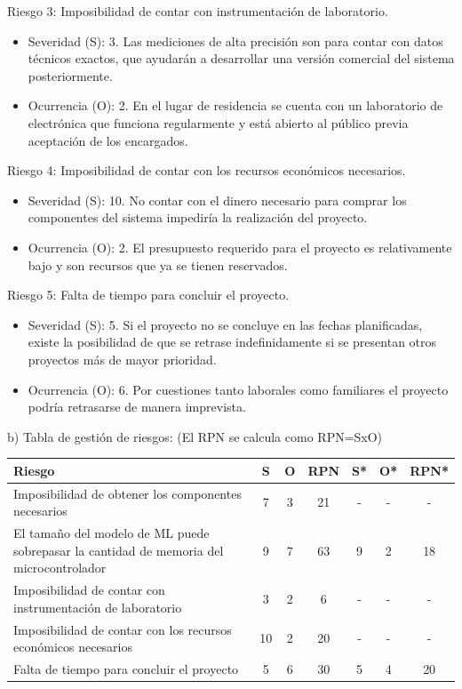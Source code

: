 \documentclass[
11pt, %
]{plan}
\begin{document}
Riesgo 3: Imposibilidad de contar con instrumentación de laboratorio.
\begin{itemize}
	\item Severidad (S): 3. Las mediciones de alta precisión son para contar con datos técnicos exactos, que ayudarán a desarrollar una versión comercial del sistema posteriormente.
	\item Ocurrencia (O): 2. En el lugar de residencia se cuenta con un laboratorio de electrónica que funciona regularmente y está abierto al público previa aceptación de los encargados.
\end{itemize}

Riesgo 4: Imposibilidad de contar con los recursos económicos necesarios.
\begin{itemize}
	\item Severidad (S): 10. No contar con el dinero necesario para comprar los componentes del sistema impediría la realización del proyecto.
	\item Ocurrencia (O): 2. El presupuesto requerido para el proyecto es relativamente bajo y son recursos que ya se tienen reservados.
\end{itemize}

Riesgo 5: Falta de tiempo para concluir el proyecto.
\begin{itemize}
	\item Severidad (S): 5. Si el proyecto no se concluye en las fechas planificadas, existe la posibilidad de que se retrase indefinidamente si se presentan otros proyectos más de mayor prioridad.
	\item Ocurrencia (O): 6. Por cuestiones tanto laborales como familiares el proyecto podría retrasarse de manera imprevista.
\end{itemize}

b) Tabla de gestión de riesgos:      (El RPN se calcula como RPN=SxO)

\begin{table}[htpb]
\centering
\begin{tabularx}{\linewidth}{@{}|X|c|c|c|c|c|c|@{}}
\hline
\rowcolor[HTML]{C0C0C0}
Riesgo & S & O & RPN & S* & O* & RPN* \\ \hline
Imposibilidad de obtener los componentes necesarios & 7 & 3 & 21 & - & - & -\\ \hline
El tamaño del modelo de ML puede sobrepasar la cantidad de memoria del microcontrolador & 9 & 7 & 63 & 9 & 2 & 18\\ \hline
Imposibilidad de contar con instrumentación de laboratorio & 3 & 2 & 6 & - & - & -\\ \hline
Imposibilidad de contar con los recursos económicos necesarios & 10 & 2 & 20 & - & - & -\\ \hline
Falta de tiempo para concluir el proyecto & 5 & 6 & 30 & 5 & 4 & 20\\ \hline
\end{tabularx}%
\end{table}
\end{document}
